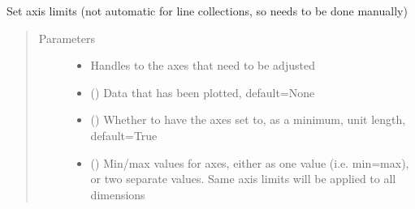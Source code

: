 \documentclass[letterpaper,10pt,english]{sphinxmanual}
\begin{document}
\begin{fulllineitems}
\label{\detokenize{_autosummary/tools.plotting.set_axis_limits:tools.plotting.set_axis_limits}}
\sphinxAtStartPar
Set axis limits (not automatic for line collections, so needs to be done manually)
\begin{quote}\begin{description}
\item[{Parameters}] \leavevmode\begin{itemize}
\item {} 
\sphinxAtStartPar
{} \textendash{} Handles to the axes that need to be adjusted

\item {} 
\sphinxAtStartPar
{} (\sphinxstyleliteralemphasis{\sphinxupquote{, }}) \textendash{} Data that has been plotted, default=None

\item {} 
\sphinxAtStartPar
{} (\sphinxstyleliteralemphasis{\sphinxupquote{, }}) \textendash{} Whether to have the axes set to, as a minimum, unit length, default=True

\item {} 
\sphinxAtStartPar
{} (\sphinxstyleliteralemphasis{\sphinxupquote{, }}) \textendash{} Min/max values for axes, either as one value (i.e. min=\sphinxhyphen{}max), or two separate values. Same axis limits will
be applied to all dimensions


\end{itemize}
\end{description}
\end{quote}
\end{fulllineitems}
\end{document}
